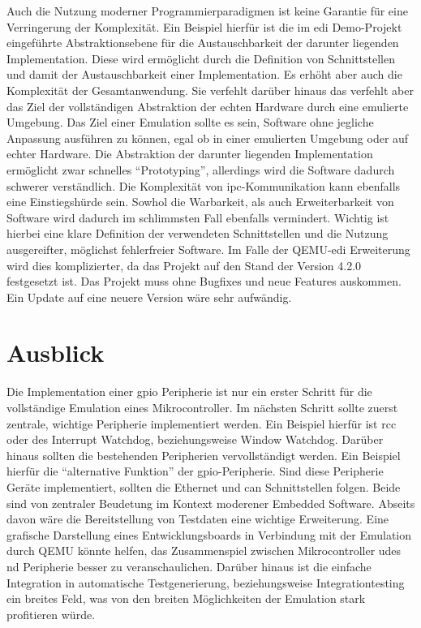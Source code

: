 Auch die Nutzung moderner Programmierparadigmen ist keine Garantie für eine
Verringerung der Komplexität.
Ein Beispiel hierfür ist die im \ac{edi} Demo-Projekt eingeführte
Abstraktionsebene für die Austauschbarkeit der darunter liegenden
Implementation.
Diese wird ermöglicht durch die Definition von Schnittstellen und damit der Austauschbarkeit einer Implementation.
Es erhöht aber auch die Komplexität der Gesamtanwendung.
Sie verfehlt darüber hinaus das verfehlt aber das Ziel der
vollständigen Abstraktion der echten Hardware durch eine emulierte Umgebung.
Das Ziel einer Emulation sollte es sein, Software ohne jegliche Anpassung
ausführen zu können, egal ob in einer emulierten Umgebung oder auf echter
Hardware.
Die Abstraktion der darunter liegenden Implementation ermöglicht zwar schnelles
\enquote{Prototyping}, allerdings wird die Software dadurch schwerer
verständlich.
Die Komplexität von \ac{ipc}-Kommunikation kann ebenfalls eine Einstiegshürde
sein.
Sowhol die Warbarkeit, als auch Erweiterbarkeit von Software wird dadurch im
schlimmsten Fall ebenfalls vermindert.
Wichtig ist hierbei eine klare Definition der verwendeten Schnittstellen und die
Nutzung ausgereifter, möglichst fehlerfreier Software.
Im Falle der QEMU-\ac{edi} Erweiterung wird dies komplizierter, da das Projekt
auf den Stand der Version 4.2.0 festgesetzt ist.
Das Projekt muss ohne Bugfixes und neue Features auskommen.
Ein Update auf eine neuere Version wäre sehr aufwändig.

\section{Ausblick}

Die Implementation einer \ac{gpio} Peripherie ist nur ein erster Schritt für
die vollständige Emulation eines Mikrocontroller.
\newline
Im nächsten Schritt sollte zuerst zentrale, wichtige Peripherie implementiert
werden.
Ein Beispiel hierfür ist \ac{rcc} oder des Interrupt Watchdog, beziehungsweise
Window Watchdog.
Darüber hinaus sollten die bestehenden Peripherien vervollständigt werden.
Ein Beispiel hierfür die \enquote{alternative Funktion} der
\ac{gpio}-Peripherie.
Sind diese Peripherie Geräte implementiert, sollten die  Ethernet und \ac{can}
Schnittstellen folgen.
Beide sind von zentraler Beudetung im Kontext moderener Embedded Software.
\newline
Abseits davon wäre die Bereitstellung von Testdaten eine wichtige Erweiterung.
Eine grafische Darstellung eines Entwicklungsboards in Verbindung mit der
Emulation durch QEMU könnte helfen, das Zusammenspiel zwischen Mikrocontroller
udes nd Peripherie besser zu veranschaulichen.
Darüber hinaus ist die einfache Integration in automatische Testgenerierung,
beziehungsweise Integrationtesting ein breites Feld, was von den breiten
Möglichkeiten der Emulation stark profitieren würde.
